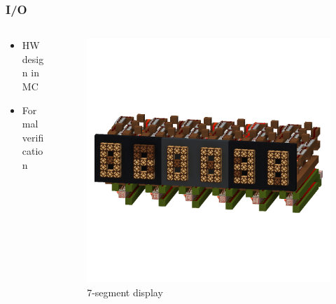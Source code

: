 \documentclass[aspectratio=169]{beamer}
\newcommand{\hw}{HW}
\begin{document}
\begin{frame}
	\frametitle{I/O}
	\begin{columns}
		\begin{column}{0.4\textwidth}
			\begin{itemize}
				\item \hw{} design in MC
				\item Formal verification
			\end{itemize}
		\end{column}
		\begin{column}{0.6\textwidth}
			\begin{figure}
				\includegraphics[width=\textwidth]{imgs/screen.png}
				\caption*{$7$-segment display}
			\end{figure}
		\end{column}
	\end{columns}
\end{frame}
\end{document}
